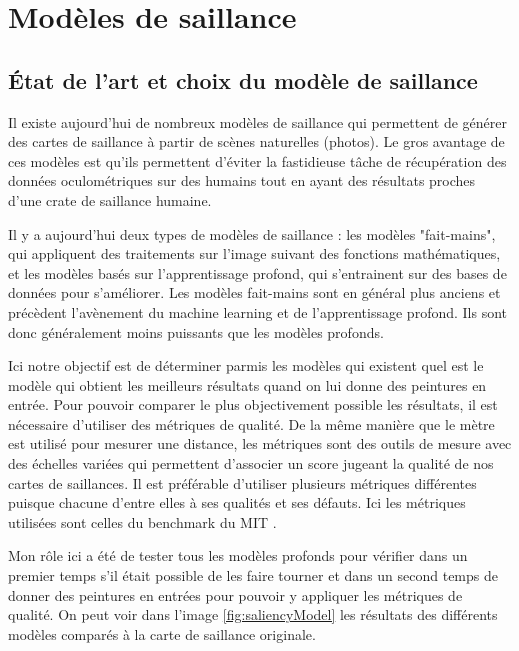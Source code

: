 \chapter{Modèles de saillance}

\section{État de l'art et choix du modèle de saillance}

\par
Il existe aujourd'hui de nombreux modèles de saillance qui permettent de générer des cartes de saillance à partir de scènes naturelles (photos). Le gros avantage de ces modèles est qu'ils permettent d'éviter la fastidieuse tâche de récupération des données oculométriques sur des humains tout en ayant des résultats proches d'une crate de saillance humaine.

\par
Il y a aujourd'hui deux types de modèles de saillance : les modèles "fait-mains", qui appliquent des traitements sur l'image suivant des fonctions mathématiques, et les modèles basés sur l'apprentissage profond, qui s'entrainent sur des bases de données pour s'améliorer. Les modèles fait-mains sont en général plus anciens et précèdent l'avènement du machine learning et de l'apprentissage profond. Ils sont donc généralement moins puissants que les modèles profonds.

\par
Ici notre objectif est de déterminer parmis les modèles qui existent quel est le modèle qui obtient les meilleurs résultats quand on lui donne des peintures en entrée. Pour pouvoir comparer le plus objectivement possible les résultats, il est nécessaire d'utiliser des métriques de qualité. De la même manière que le mètre est utilisé pour mesurer une distance, les métriques sont des outils de mesure avec des échelles variées qui permettent d'associer un score jugeant la qualité de nos cartes de saillances. Il est préférable d'utiliser plusieurs métriques différentes puisque chacune d'entre elles à ses qualités et ses défauts. Ici les métriques utilisées sont celles du benchmark du MIT \cite{benchmark_MIT}.

\par
Mon rôle ici a été de tester tous les modèles profonds pour vérifier dans un premier temps s'il était possible de les faire tourner et dans un second temps de donner des peintures en entrées pour pouvoir y appliquer les métriques de qualité. On peut voir dans l'image \ref{fig:saliencyModel} les résultats des différents modèles comparés à la carte de saillance originale. 


